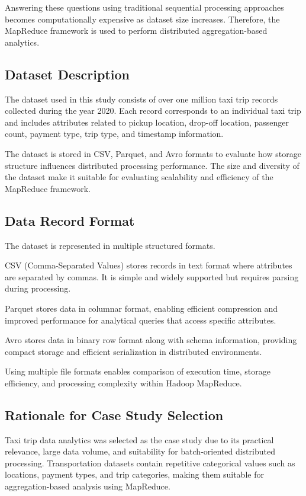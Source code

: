 \documentclass[12pt,a4paper]{report}
\begin{document}
Answering these questions using traditional sequential processing approaches becomes
computationally expensive as dataset size increases. Therefore, the MapReduce
framework is used to perform distributed aggregation-based analytics.


\subsection{Dataset Description}

The dataset used in this study consists of over one million taxi trip records collected
during the year 2020. Each record corresponds to an individual taxi trip and includes
attributes related to pickup location, drop-off location, passenger count, payment type,
trip type, and timestamp information.

The dataset is stored in CSV, Parquet, and Avro formats to evaluate how storage
structure influences distributed processing performance. The size and diversity of the
dataset make it suitable for evaluating scalability and efficiency of the MapReduce
framework.


\subsection{Data Record Format}

The dataset is represented in multiple structured formats.

CSV (Comma-Separated Values) stores records in text format where attributes are
separated by commas. It is simple and widely supported but requires parsing during
processing.

Parquet stores data in columnar format, enabling efficient compression and improved
performance for analytical queries that access specific attributes.

Avro stores data in binary row format along with schema information, providing compact
storage and efficient serialization in distributed environments.

Using multiple file formats enables comparison of execution time, storage efficiency,
and processing complexity within Hadoop MapReduce.


\subsection{Rationale for Case Study Selection}

Taxi trip data analytics was selected as the case study due to its practical relevance,
large data volume, and suitability for batch-oriented distributed processing. Transportation
datasets contain repetitive categorical values such as locations, payment types, and trip
categories, making them suitable for aggregation-based analysis using MapReduce.
\end{document}
